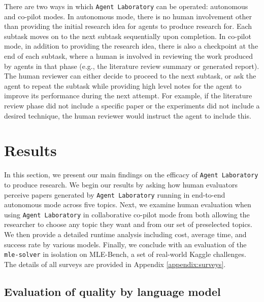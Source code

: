 \documentclass[11pt, a4paper]{gdm_format}
\begin{document}
There are two ways in which \texttt{Agent Laboratory} can be operated: autonomous and co-pilot modes. In autonomous mode, there is no human involvement other than providing the initial research idea for agents to produce research for. Each subtask moves on to the next subtask sequentially upon completion. In co-pilot mode, in addition to providing the research idea, there is also a checkpoint at the end of each subtask, where a human is involved in reviewing the work produced by agents in that phase (e.g., the literature review summary or generated report). The human reviewer can either decide to proceed to the next subtask, or ask the agent to repeat the subtask while providing high level notes for the agent to improve its performance during the next attempt. For example, if the literature review phase did not include a specific paper or the experiments did not include a desired technique, the human reviewer would instruct the agent to include this. 





\section{Results}
\label{sec:results}

In this section, we present our main findings on the efficacy of \texttt{Agent Laboratory} to produce research.
We begin our results by asking how human evaluators perceive papers generated by \texttt{Agent Laboratory} running in end-to-end autonomous mode across five topics. Next, we examine human evaluation when using \texttt{Agent Laboratory} in collaborative co-pilot mode from both allowing the researcher to choose any topic they want and from our set of preselected topics. We then provide a detailed runtime analysis including cost, average time, and success rate by various models. Finally, we conclude with an evaluation of the \texttt{mle-solver} in isolation on MLE-Bench, a set of real-world Kaggle challenges. The details of all surveys are provided in Appendix \ref{appendix:surveys}.



\subsection{Evaluation of quality by language model}
\label{sec:humanpercept}
\end{document}
